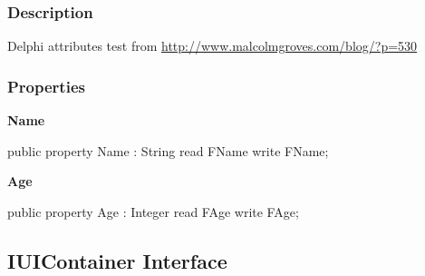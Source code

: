 \documentclass{report}
\newif\ifpdf
\begin{document}
\subsubsection*{\large{\textbf{Description}}\normalsize\hspace{1ex}\hfill}
Delphi attributes test from \href{http://www.malcolmgroves.com/blog/?p=530}{http://www.malcolmgroves.com/blog/?p=530}\subsubsection*{\large{\textbf{Properties}}\normalsize\hspace{1ex}\hfill}
\begin{list}{}{
\setlength{\itemindent}{0cm}
\setlength{\listparindent}{0cm}
\setlength{\leftmargin}{\evensidemargin}
\addtolength{\leftmargin}{\tmplength}
\settowidth{\labelsep}{X}
\addtolength{\leftmargin}{\labelsep}
\setlength{\labelwidth}{\tmplength}
}
\label{ok_attributes.TPerson-Name}
\item[\textbf{Name}\hfill]
\ifpdf
\begin{flushleft}
\fi
\begin{ttfamily}
public property Name : String read FName write FName;\end{ttfamily}

\ifpdf
\end{flushleft}
\fi


\par  \label{ok_attributes.TPerson-Age}
\item[\textbf{Age}\hfill]
\ifpdf
\begin{flushleft}
\fi
\begin{ttfamily}
public property Age : Integer read FAge write FAge;\end{ttfamily}

\ifpdf
\end{flushleft}
\fi


\par  \end{list}
\ifpdf
\subsection*{\large{\textbf{IUIContainer Interface}}\normalsize\hspace{1ex}\hrulefill}
\else
\subsection*{IUIContainer Interface}
\fi
\label{ok_attributes.IUIContainer}
\end{document}

